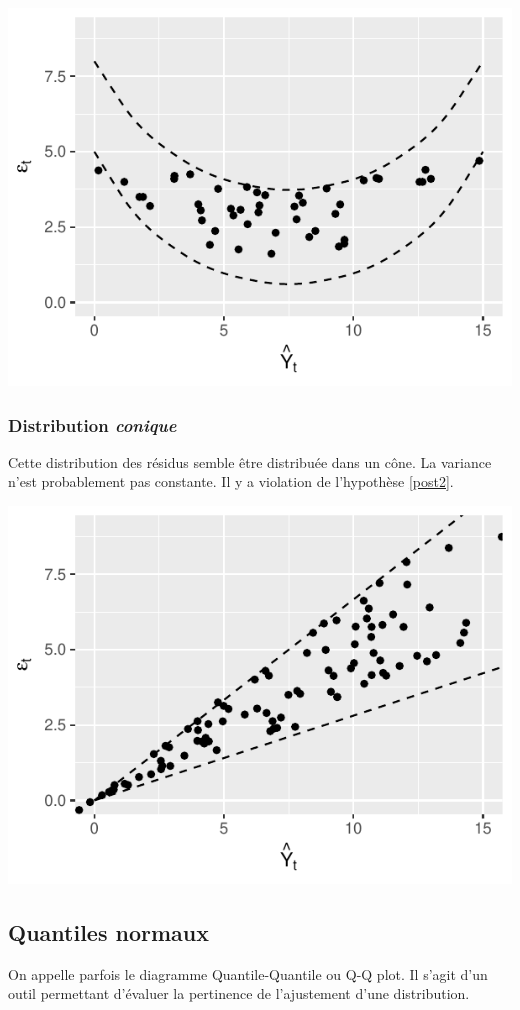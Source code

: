\documentclass[11pt,french]{report}
\begin{document}
\bigskip
\includegraphics{notes_de_cours-033}

\subsubsection{Distribution \emph{conique}}
Cette distribution des résidus semble être distribuée dans un cône. La variance n'est probablement pas constante. Il y a violation de l'hypothèse \ref{post2}. 

\bigskip
\includegraphics{notes_de_cours-034}

\subsection{Quantiles normaux}
On appelle parfois le diagramme Quantile-Quantile ou Q-Q plot. Il s'agit d'un outil permettant d'évaluer la pertinence de l'ajustement d'une distribution. \newline
\end{document}
